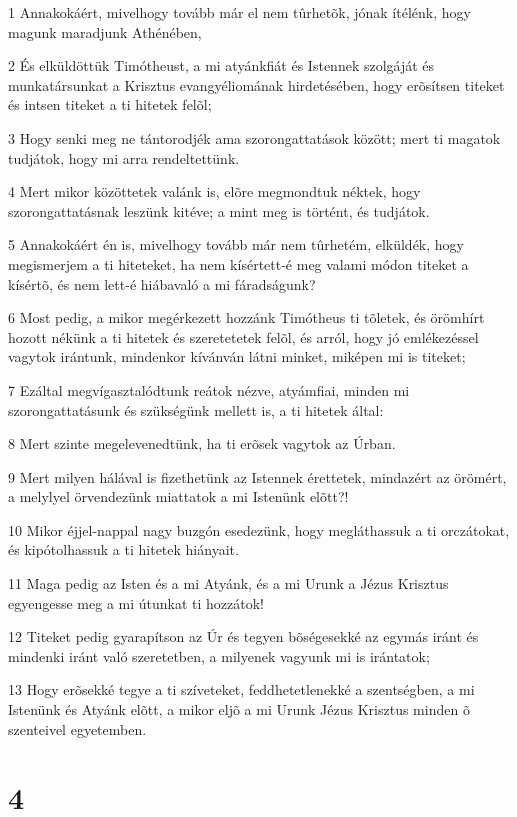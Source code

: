 \par 1 Annakokáért, mivelhogy tovább már el nem tûrhetõk, jónak ítélénk, hogy magunk maradjunk Athénében,
\par 2 És elküldöttük Timótheust, a mi atyánkfiát és Istennek szolgáját és munkatársunkat a Krisztus evangyéliomának hirdetésében, hogy erõsítsen titeket és intsen titeket a ti hitetek felõl;
\par 3 Hogy senki meg ne tántorodjék ama szorongattatások között; mert ti magatok tudjátok, hogy mi arra rendeltettünk.
\par 4 Mert mikor közöttetek valánk is, elõre megmondtuk néktek, hogy szorongattatásnak leszünk kitéve; a mint meg is történt, és tudjátok.
\par 5 Annakokáért én is, mivelhogy tovább már nem tûrhetém, elküldék, hogy megismerjem a ti hiteteket, ha nem kísértett-é meg valami módon titeket a kísértõ, és nem lett-é hiábavaló a mi fáradságunk?
\par 6 Most pedig, a mikor megérkezett hozzánk Timótheus ti tõletek, és örömhírt hozott nékünk a ti hitetek és szeretetetek felõl, és arról, hogy jó emlékezéssel vagytok irántunk, mindenkor kívánván látni minket, miképen mi is titeket;
\par 7 Ezáltal megvígasztalódtunk reátok nézve, atyámfiai, minden mi szorongattatásunk és szükségünk mellett is, a ti hitetek által:
\par 8 Mert szinte megelevenedtünk, ha ti erõsek vagytok az Úrban.
\par 9 Mert milyen hálával is fizethetünk az Istennek érettetek, mindazért az örömért, a melylyel örvendezünk miattatok a mi Istenünk elõtt?!
\par 10 Mikor éjjel-nappal nagy buzgón esedezünk, hogy megláthassuk a ti orczátokat, és kipótolhassuk a ti hitetek hiányait.
\par 11 Maga pedig az Isten és a mi Atyánk, és a mi Urunk a Jézus Krisztus egyengesse meg a mi útunkat ti hozzátok!
\par 12 Titeket pedig gyarapítson az Úr és tegyen bõségesekké az egymás iránt és mindenki iránt való szeretetben, a milyenek vagyunk mi is irántatok;
\par 13 Hogy erõsekké tegye a ti szíveteket, feddhetetlenekké a szentségben, a mi Istenünk és Atyánk elõtt, a mikor eljõ a mi Urunk Jézus Krisztus minden õ szenteivel egyetemben.

\chapter{4}

